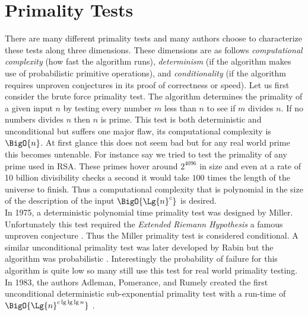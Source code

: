 \documentclass[./Thesis.tex]{subfiles}
\begin{document}
\section{Primality Tests}
There are many different primality tests and many authors choose to characterize
these tests along three dimensions. These dimensions are as follows
\textit{computational complexity} (how fast the algorithm runs),
\textit{determinism} (if the algorithm makes use of probabilistic primitive
operations), and \textit{conditionality} (if the algorithm requires unproven
conjectures in its proof of correctness or speed). Let us first consider the
brute force primality test. The algorithm determines the primality of a given
input $n$ by testing every number $m$ less than $n$ to see if $m$ divides $n$.
If no numbers divides $n$ then $n$ is prime. This test is both deterministic and
unconditional but suffers one major flaw, its computational complexity is
$\BigO{n}$. At first glance this does not seem bad but for any real world prime
this becomes untenable. For instance say we tried to test the primality of any
prime used in RSA. These primes hover around $2^{4096}$ in size and even at a
rate of 10 billion divisibility checks a second it would take $100$ times the
length of the universe to finish. Thus a computational complexity that is
polynomial in the size of the description of the input $\BigO{\Lg{n}^c}$ is desired. \\

In 1975, a deterministic polynomial time primality test was designed by Miller.
Unfortunately this test required the
\textit{Extended Riemann Hypothesis} a famous unproven conjecture \cite{miller}.
Thus the Miller primality test is considered conditional. A similar
unconditional primality test was later developed by Rabin but the algorithm was
probabilistic \cite{rabin}. Interestingly the probability of failure for this
algorithm is quite low so many still use this test for real world primality
testing. In 1983, the authors Adleman, Pomerance, and Rumely created the first
unconditional deterministic sub-exponential primality test with a run-time of
$\BigO{\Lg{n}^{c \, \text{lg} \, \text{lg} \, \text{lg} \, n}}$ \cite{apr}. \\
\end{document}
